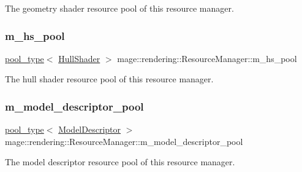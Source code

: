 The geometry shader resource pool of this resource manager. \hypertarget{classmage_1_1rendering_1_1_resource_manager_acea62c6cf52bd332ee3e0d1575c02e29}{}\label{classmage_1_1rendering_1_1_resource_manager_acea62c6cf52bd332ee3e0d1575c02e29} 
\subsubsection{\texorpdfstring{m\+\_\+hs\+\_\+pool}{m\_hs\_pool}}
{\footnotesize\ttfamily \hyperlink{classmage_1_1rendering_1_1_resource_manager_ab21a4e280087032ee533f267bd9bf602}{pool\+\_\+type}$<$ \hyperlink{namespacemage_1_1rendering_aa133f36cd1a81c87eedf962270a12f48}{Hull\+Shader} $>$ mage\+::rendering\+::\+Resource\+Manager\+::m\+\_\+hs\+\_\+pool\hspace{0.3cm}{\ttfamily [private]}}

The hull shader resource pool of this resource manager. \hypertarget{classmage_1_1rendering_1_1_resource_manager_a43db83f825b58a85c34e633d5807171d}{}\label{classmage_1_1rendering_1_1_resource_manager_a43db83f825b58a85c34e633d5807171d} 
\subsubsection{\texorpdfstring{m\+\_\+model\+\_\+descriptor\+\_\+pool}{m\_model\_descriptor\_pool}}
{\footnotesize\ttfamily \hyperlink{classmage_1_1rendering_1_1_resource_manager_ab21a4e280087032ee533f267bd9bf602}{pool\+\_\+type}$<$ \hyperlink{classmage_1_1rendering_1_1_model_descriptor}{Model\+Descriptor} $>$ mage\+::rendering\+::\+Resource\+Manager\+::m\+\_\+model\+\_\+descriptor\+\_\+pool\hspace{0.3cm}{\ttfamily [private]}}

The model descriptor resource pool of this resource manager. \hypertarget{classmage_1_1rendering_1_1_resource_manager_a73f970f19438b2e2f02a5ede41e8faf4}{}\label{classmage_1_1rendering_1_1_resource_manager_a73f970f19438b2e2f02a5ede41e8faf4} 
